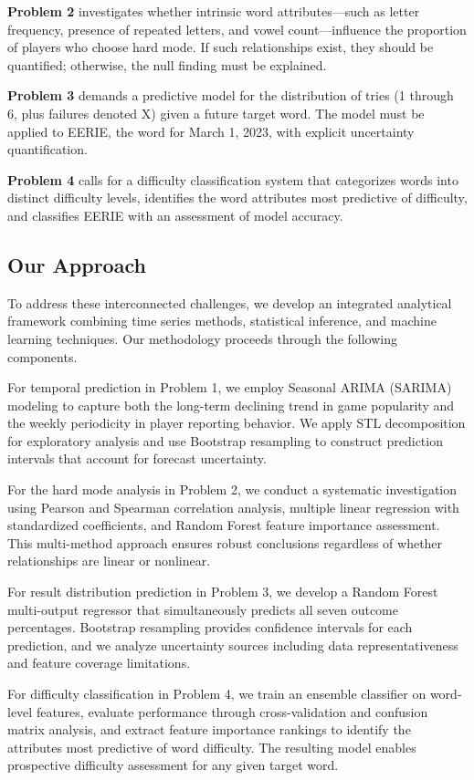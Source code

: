 \documentclass{mcmthesis}
\begin{document}
\textbf{Problem 2} investigates whether intrinsic word attributes---such as letter frequency, presence of repeated letters, and vowel count---influence the proportion of players who choose hard mode. If such relationships exist, they should be quantified; otherwise, the null finding must be explained.

\textbf{Problem 3} demands a predictive model for the distribution of tries (1 through 6, plus failures denoted X) given a future target word. The model must be applied to EERIE, the word for March 1, 2023, with explicit uncertainty quantification.

\textbf{Problem 4} calls for a difficulty classification system that categorizes words into distinct difficulty levels, identifies the word attributes most predictive of difficulty, and classifies EERIE with an assessment of model accuracy.

\subsection{Our Approach}

To address these interconnected challenges, we develop an integrated analytical framework combining time series methods, statistical inference, and machine learning techniques. Our methodology proceeds through the following components.

For temporal prediction in Problem 1, we employ Seasonal ARIMA (SARIMA) modeling to capture both the long-term declining trend in game popularity and the weekly periodicity in player reporting behavior. We apply STL decomposition for exploratory analysis and use Bootstrap resampling to construct prediction intervals that account for forecast uncertainty.

For the hard mode analysis in Problem 2, we conduct a systematic investigation using Pearson and Spearman correlation analysis, multiple linear regression with standardized coefficients, and Random Forest feature importance assessment. This multi-method approach ensures robust conclusions regardless of whether relationships are linear or nonlinear.

For result distribution prediction in Problem 3, we develop a Random Forest multi-output regressor that simultaneously predicts all seven outcome percentages. Bootstrap resampling provides confidence intervals for each prediction, and we analyze uncertainty sources including data representativeness and feature coverage limitations.

For difficulty classification in Problem 4, we train an ensemble classifier on word-level features, evaluate performance through cross-validation and confusion matrix analysis, and extract feature importance rankings to identify the attributes most predictive of word difficulty. The resulting model enables prospective difficulty assessment for any given target word.
\end{document}
